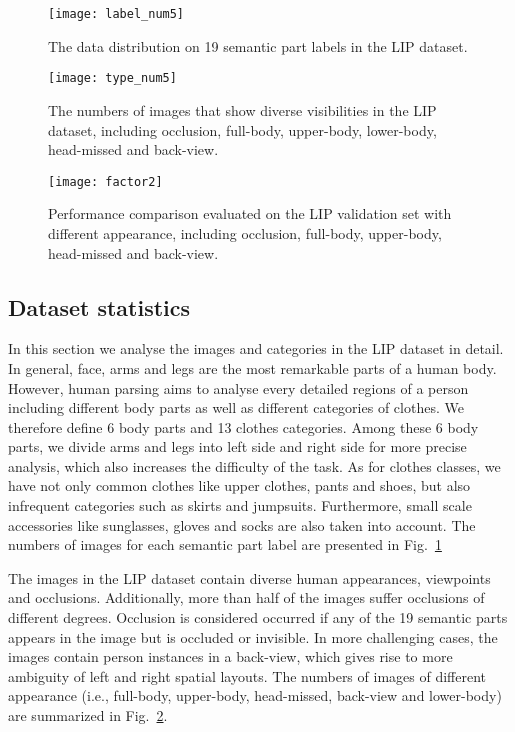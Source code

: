 \documentclass[10pt,twocolumn,letterpaper]{article}
\begin{document}
\begin{figure}[]
\centering
   \texttt{[image: label\_num5]}
\vspace{-4mm}
\caption{The data distribution on 19 semantic part labels in the LIP dataset.}
\vspace{-4mm}
\label{fig: dataset_analysis_label}
\end{figure}
\begin{figure}[]
\centering
   \texttt{[image: type\_num5]}
\vspace{-3mm}
\caption{The numbers of images that show diverse visibilities in the LIP dataset, including occlusion, full-body, upper-body, lower-body, head-missed and back-view.}
\vspace{-6mm}
\label{fig: dataset_analysis_factor}
\end{figure}
\begin{figure}[]
\centering
   \texttt{[image: factor2]}
\vspace{-4mm}
\caption{Performance comparison evaluated on the LIP validation set with different appearance, including occlusion, full-body, upper-body, head-missed and back-view.}
\vspace{-6mm}
\label{fig: analysis_val}
\end{figure}

\subsection{Dataset statistics}
In this section we analyse the images and categories in the LIP dataset in detail. In general, face, arms and legs are the most remarkable parts of a human body. However, human parsing aims to analyse every detailed regions of a person including different body parts as well as different categories of clothes. We therefore define 6 body parts and 13 clothes categories. Among these 6 body parts, we divide arms and legs into left side and right side for more precise analysis, which also increases the difficulty of the task. As for clothes classes, we have not only common clothes like upper clothes, pants and shoes, but also infrequent categories such as skirts and jumpsuits. Furthermore, small scale accessories like sunglasses, gloves and socks are also taken into account. The numbers of images for each semantic part label are presented in Fig.~\ref{fig: dataset_analysis_label}

The images in the LIP dataset contain diverse human appearances, viewpoints and occlusions. Additionally, more than half of the images suffer occlusions of different degrees. Occlusion is considered occurred if any of the 19 semantic parts appears in the image but is occluded or invisible. In more challenging cases, the images contain person instances in a back-view, which gives rise to more ambiguity of left and right spatial layouts. The numbers of images of different appearance (i.e.\occlusion, full-body, upper-body, head-missed, back-view and lower-body) are summarized in Fig.~\ref{fig: dataset_analysis_factor}.
\end{document}
